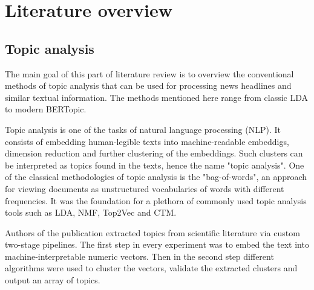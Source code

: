 \documentclass[3p,times,procedia]{elsarticle}
\begin{document}

\section{Literature overview}


\setlength{\belowdisplayskip}{12pt} \setlength{\belowdisplayshortskip}{7pt}
\setlength{\abovedisplayskip}{12pt} \setlength{\abovedisplayshortskip}{7pt}


\subsection{Topic analysis} \label{ta}

The main goal of this part of literature review is to overview the conventional methods of topic analysis that can be used for processing news headlines and similar textual information. The methods mentioned here range from classic LDA to modern BERTopic.

Topic analysis is one of the tasks of natural language processing (NLP). It consists of embedding human-legible texts into machine-readable embeddigs, dimension reduction and further clustering of the embeddings. Such clusters can be interpreted as topics found in the texts, hence the name "topic analysis". One of the classical methodologies of topic analysis is the "bag-of-words", an approach for viewing documents as unstructured vocabularies of words with different frequencies. It was the foundation for a plethora of commonly used topic analysis tools such as LDA, NMF, Top2Vec and CTM.

Authors of the publication \cite{onan2019two} extracted topics from scientific literature via custom two-stage pipelines. The first step in every experiment was to embed the text into machine-interpretable numeric vectors. Then in the second step different algorithms were used to cluster the vectors, validate the extracted clusters and output an array of topics.
\end{document}
